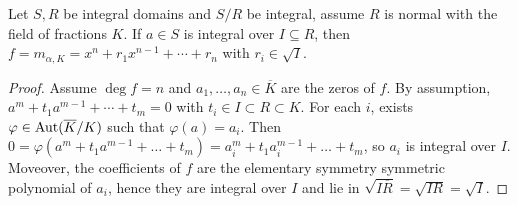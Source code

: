 \begin{prop} \label{prop:integral-then-coefficients-in-radical}
  Let $S, R$ be integral domains and $S/R$ be integral, assume $R$ is normal
  with the field of fractions $K$. If $a \in S$ is integral over $I \subseteq R$, then
  $f = m_{\alpha, K} = x^n + r_1 x^{n-1} + \dotsm + r_n$ with $r_i \in \sqrt{I}$.

  \begin{proof}
    Assume $\deg f = n$ and $a_1, \dots, a_n \in \overline{K}$
    are the zeros of $f$. By assumption, $a^m + t_1 a^{m-1} + \dotsm + t_m = 0$
    with $t_i \in I \subset R \subset K$.
    For each $i$, exists $\varphi \in \operatorname{Aut}(\overline{K}/K)$ such that
    $\varphi(a) = a_i$.
    Then $0 = \varphi(a^m + t_1 a^{m-1} + \dots + t_m) = a_i^m + t_1 a_i^{m-1} + \dots
    + t_m$, so $a_i$ is integral over $I$. Moveover, the coefficients
    of $f$ are the elementary symmetry symmetric polynomial of $a_i$,
    hence they are integral over $I$ and lie in $\sqrt{I \overline{R}} = \sqrt{IR} = \sqrt{I}$.
  \end{proof}
\end{prop}

